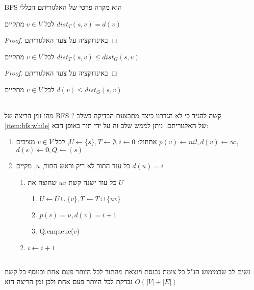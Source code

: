 \begin{corollary}
BFS
הוא מקרה פרטי של האלגוריתם הכללי
\end{corollary}

\begin{claim}
לכל
$v \in V$
מתקיים
$dist_T(s, v) = d(v)$
\end{claim}
\begin{proof}
באינדוקציה על צעד האלגוריתם
\end{proof}

\begin{claim}
לכל
$v \in V$
מתקיים
$dist_T(s, v) \leq dist_G(s,v)$
\end{claim}
\begin{proof}
באינדוקציה על צעד האלגוריתם
\end{proof}

\begin{theorem}
לכל
$v \in V$
מתקיים
$d(v) \leq dist_G(s,v)$
\end{theorem}
\\
\noindent
מהו זמן הריצה של BFS ? קשה להגיד כי לא הגדרנו כיצד מתבצעת הבדיקה בשלב 
\ref{item:bfs:while}
של האלגוריתם. ניתן לממש שלב זה על ידי תור באופן הבא:
\begin{enumerate}
\item
אתחול:
$U \leftarrow \{s\}, T \leftarrow \emptyset, i \leftarrow 0$, 
לכל 
$v \in V$
מציבים
$p(v) \leftarrow nil, d(v) \leftarrow \infty$,
$d(s) \leftarrow 0, Q \leftarrow (s)$
\item 
כל עוד התור לא ריק וראש התור, $u$, מקיים
$d(u) = i$
\begin{enumerate}
	\item
	כל עוד ישנה קשת 
	$uv$
	שחוצה את $U$
		\begin{enumerate}
		\item
		$U \leftarrow U \cup \{v\}, T \leftarrow T \cup \{uv\}$
		\item
		$p(v) = u, d(v) = i + 1$
		\item
		\textenglish{Q.enqueue($v$)}
		\end{enumerate}
	\item
	$i \leftarrow i+1$
	\end{enumerate}
\end{enumerate}
\\
\noindent
נשים לב שבמימוש הנ"ל כל צומת נכנסת ויוצאת מהתור לכל היותר פעם אחת 
ובנוסף כל קשת נבדקת לכל היותר פעם אחת ולכן זמן הריצה הוא 
$O(|V| + |E|)$













